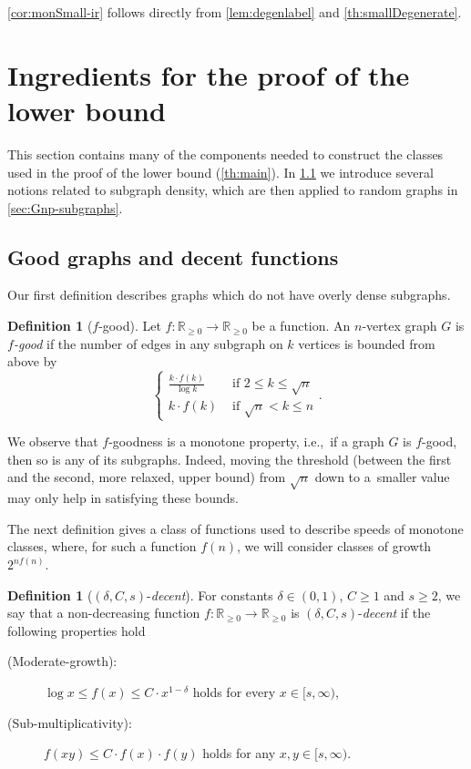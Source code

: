 \documentclass[letterpaper,11pt]{article}
\newcommand{\dec}{decent\xspace}
\newcommand{\Rrr}{\mathbb{R}_{\geq 0}}
\theoremstyle{definition}
\newtheorem{definition}[theorem]{Definition}
\theoremstyle{remark}
\renewcommand{\leq}{\leqslant}
\renewcommand{\geq}{\geqslant}
\begin{document}
\cref{cor:monSmall-ir} follows directly from \cref{lem:degenlabel} and \cref{th:smallDegenerate}.	
		
		
		
		
\section{Ingredients for the proof of the lower bound}
\label{sec:ingredients}
		
	This section contains many of the components needed to construct the classes used in the proof of the lower bound (\cref{th:main}). In \cref{sec:GoodDecent} we introduce several notions related to subgraph density, which are then applied to random graphs in \cref{sec:Gnp-subgraphs}. 
		\subsection{Good graphs and decent functions}\label{sec:GoodDecent} 
		
		
		
		Our first definition describes graphs which do not have overly dense subgraphs. 
		\begin{definition}[$f$-good]\label{def:good}
			Let $f: \Rrr \rightarrow \Rrr$ be a function.
			An $n$-vertex graph $G$ is \emph{$f$-good} if the number of edges in any subgraph on $k$ vertices is bounded from above by 	
			\[\begin{cases}
				\frac{k\cdot f(k)}{\log k} & \text{ if }  2 \leq k \leq  \sqrt{n}   \\
				k\cdot f(k) & \text{ if }   \sqrt{n} < k \leq n  
			\end{cases}.\]  
		\end{definition}
		
		We observe that $f$-goodness is a monotone property, i.e.,\ if a graph $G$ is $f$-good, then so is any of its subgraphs.
		Indeed, moving the threshold (between the first and the second, more relaxed, upper bound) from $\sqrt n$ down to a~smaller value may only help in satisfying these bounds.
		
		The next definition gives a class of functions used to describe speeds of monotone classes, where, for such a function $f(n)$, we will consider classes of growth $2^{nf(n)}$. 
		\begin{definition}[$(\delta,C,s)$-\emph{\dec}]\label{def:beaut} For constants $\delta \in (0,1)$, $C\geq 1$ and $s\geq 2$, we say that a non-decreasing function $f :\Rrr  \rightarrow \Rrr$ is $(\delta,C,s)$-\emph{\dec} if the following properties hold
			\begin{description}
				\item[(Moderate-growth):] $\log x \leq f(x) \leq C\cdot x^{1 - \delta}$ holds for every $x \in [s,\infty)$, 
				\item[(Sub-multiplicativity):]  $f(xy) \leq C\cdot f(x)\cdot f(y)$ holds for any $x,y \in [s,\infty)$.
			\end{description}
		\end{definition}
		
\end{document}
